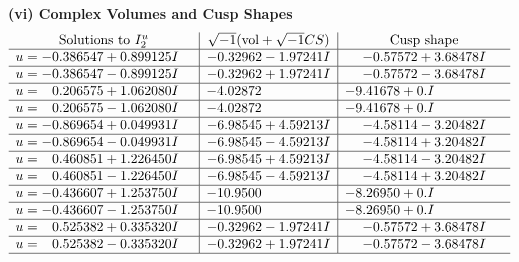 \documentclass[1p]{elsarticle_modified}
\theoremstyle{definition}
\newcommand{\I}{\sqrt{-1}}
\begin{document}
\newpage\flushleft \textbf{(vi) Complex Volumes and Cusp Shapes}
$$\begin{array}{c|c|c}  
\text{Solutions to }I^u_{2}& \I (\text{vol} + \sqrt{-1}CS) & \text{Cusp shape}\\
 \hline 
\begin{aligned}
u &= -0.386547 + 0.899125 I\end{aligned}
 & -0.32962 - 1.97241 I & -0.57572 + 3.68478 I \\ \hline\begin{aligned}
u &= -0.386547 - 0.899125 I\end{aligned}
 & -0.32962 + 1.97241 I & -0.57572 - 3.68478 I \\ \hline\begin{aligned}
u &= \phantom{-}0.206575 + 1.062080 I\end{aligned}
 & -4.02872\phantom{ +0.000000I} & -9.41678 + 0. I\phantom{ +0.000000I} \\ \hline\begin{aligned}
u &= \phantom{-}0.206575 - 1.062080 I\end{aligned}
 & -4.02872\phantom{ +0.000000I} & -9.41678 + 0. I\phantom{ +0.000000I} \\ \hline\begin{aligned}
u &= -0.869654 + 0.049931 I\end{aligned}
 & -6.98545 + 4.59213 I & -4.58114 - 3.20482 I \\ \hline\begin{aligned}
u &= -0.869654 - 0.049931 I\end{aligned}
 & -6.98545 - 4.59213 I & -4.58114 + 3.20482 I \\ \hline\begin{aligned}
u &= \phantom{-}0.460851 + 1.226450 I\end{aligned}
 & -6.98545 + 4.59213 I & -4.58114 - 3.20482 I \\ \hline\begin{aligned}
u &= \phantom{-}0.460851 - 1.226450 I\end{aligned}
 & -6.98545 - 4.59213 I & -4.58114 + 3.20482 I \\ \hline\begin{aligned}
u &= -0.436607 + 1.253750 I\end{aligned}
 & -10.9500\phantom{ +0.000000I} & -8.26950 + 0. I\phantom{ +0.000000I} \\ \hline\begin{aligned}
u &= -0.436607 - 1.253750 I\end{aligned}
 & -10.9500\phantom{ +0.000000I} & -8.26950 + 0. I\phantom{ +0.000000I} \\ \hline\begin{aligned}
u &= \phantom{-}0.525382 + 0.335320 I\end{aligned}
 & -0.32962 - 1.97241 I & -0.57572 + 3.68478 I \\ \hline\begin{aligned}
u &= \phantom{-}0.525382 - 0.335320 I\end{aligned}
 & -0.32962 + 1.97241 I & -0.57572 - 3.68478 I\\
 \hline 
 \end{array}$$\newpage
\end{document}
